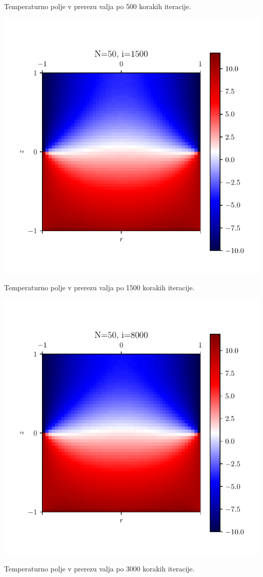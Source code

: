 \begin{center}
\begin{minipage}{0.45\textwidth}
    \caption{Temperaturno polje v prerezu valja po 500 korakih iteracije.}
    \end{minipage}

     \begin{minipage}{0.45\textwidth}
        \centering
    \includegraphics[width=\textwidth]{../old/2-valj-profili50_1500.pdf}
    \caption{Temperaturno polje v prerezu valja po 1500 korakih iteracije.}
    \end{minipage}\hfill
    \begin{minipage}{0.45\textwidth}
        \centering
    \includegraphics[width=\textwidth]{../old/2-valj-profili50_8000.pdf}
    \caption{Temperaturno polje v prerezu valja po 3000 korakih iteracije.}
    \end{minipage}
\end{center}

